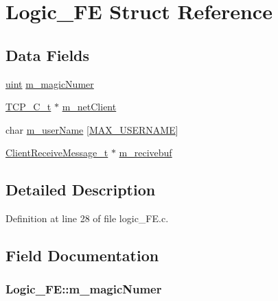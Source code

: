 \hypertarget{structLogic__FE}{}\section{Logic\+\_\+\+FE Struct Reference}
\label{structLogic__FE}
\subsection*{Data Fields}
\begin{DoxyCompactItemize}
\item 
\hyperlink{tcp_8h_a91ad9478d81a7aaf2593e8d9c3d06a14}{uint} \hyperlink{structLogic__FE_a84df830cba58cdc132aaba2b6ee74c55}{m\+\_\+magic\+Numer}
\item 
\hyperlink{tcp__client_8h_a3db7b57ed8c85377051fea41ecaf4ff9}{T\+C\+P\+\_\+\+C\+\_\+t} $\ast$ \hyperlink{structLogic__FE_a06cbcf2558d20e6d419e25b0f59f4b9a}{m\+\_\+net\+Client}
\item 
char \hyperlink{structLogic__FE_afc81e6f40bbe8553a56a6e890ace96c4}{m\+\_\+user\+Name} \mbox{[}\hyperlink{Protocol_8h_a2d9316e742860ef57fe46a27e67d5efe}{M\+A\+X\+\_\+\+U\+S\+E\+R\+N\+A\+ME}\mbox{]}
\item 
\hyperlink{Protocol_8h_ae2f0907dd30e2cf75f61a8294018f702}{Client\+Receive\+Message\+\_\+t} $\ast$ \hyperlink{structLogic__FE_ad5c78d6067e74dd81af08e3f4226556f}{m\+\_\+recivebuf}
\end{DoxyCompactItemize}


\subsection{Detailed Description}


Definition at line 28 of file logic\+\_\+\+F\+E.\+c.



\subsection{Field Documentation}
\subsubsection[{\texorpdfstring{m\+\_\+magic\+Numer}{m_magicNumer}}]{ Logic\+\_\+\+F\+E\+::m\+\_\+magic\+Numer}\hypertarget{structLogic__FE_a84df830cba58cdc132aaba2b6ee74c55}{}\label{structLogic__FE_a84df830cba58cdc132aaba2b6ee74c55}


